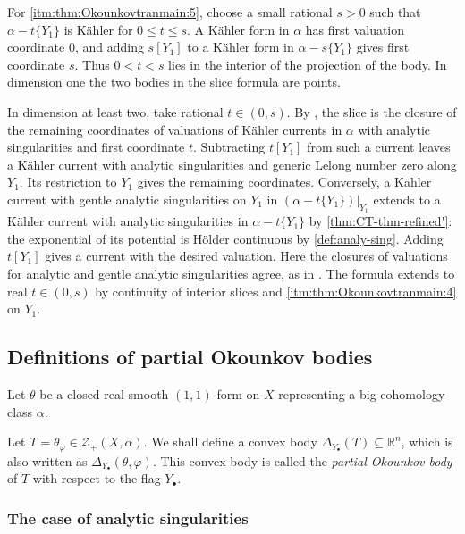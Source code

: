 For \ref{itm:thm:Okounkovtranmain:5}, choose a small rational $s>0$ such that $\alpha-t\{Y_1\}$ is Kähler for $0\leq t\leq s$. A Kähler form in $\alpha$ has first valuation coordinate $0$, and adding $s[Y_1]$ to a Kähler form in $\alpha-s\{Y_1\}$ gives first coordinate $s$. Thus $0<t<s$ lies in the interior of the projection of the body. In dimension one the two bodies in the slice formula are points.

In dimension at least two, take rational $t\in(0,s)$. By \cite[Lemma~7.4 in arXiv:2309.07584v3]{DRWNXZ}, the slice is the closure of the remaining coordinates of valuations of Kähler currents in $\alpha$ with analytic singularities and first coordinate $t$. Subtracting $t[Y_1]$ from such a current leaves a Kähler current with analytic singularities and generic Lelong number zero along $Y_1$. Its restriction to $Y_1$ gives the remaining coordinates. Conversely, a Kähler current with gentle analytic singularities on $Y_1$ in $(\alpha-t\{Y_1\})|_{Y_1}$ extends to a Kähler current with analytic singularities in $\alpha-t\{Y_1\}$ by \cref{thm:CT-thm-refined'}: the exponential of its potential is H\"older continuous by \cref{def:analy-sing}. Adding $t[Y_1]$ gives a current with the desired valuation. Here the closures of valuations for analytic and gentle analytic singularities agree, as in \cite[Section~3]{DRWNXZ}. The formula extends to real $t\in(0,s)$ by continuity of interior slices and \ref{itm:thm:Okounkovtranmain:4} on $Y_1$.

\subsection{Definitions of partial Okounkov bodies}
\label{subsec:tpob_def}
Let $\theta$ be a closed real smooth $(1,1)$-form on $X$ representing a big cohomology class $\alpha$.

Let $T=\theta_{\varphi}\in \mathcal{Z}_+(X,\alpha)$. We shall define a convex body $\Delta_{Y_{\bullet}}(T)\subseteq \mathbb{R}^n$, which is also written as $\Delta_{Y_{\bullet}}(\theta,\varphi)$. This convex body is called the \emph{partial Okounkov body} of $T$ with respect to the flag $Y_{\bullet}$.

\subsubsection{The case of analytic singularities}
\label{subsubsec:tpob_analytic}

